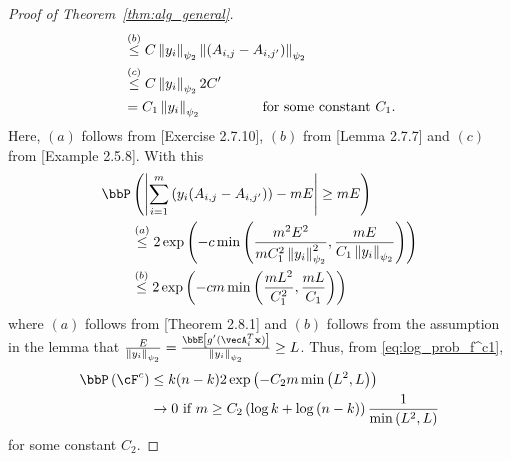\begin{proof}[Proof of Theorem~\ref{thm:alg_general}]
\begin{align*}
&\stackrel{(b)}{\leq} C\left\lVert{y_i}\right\rVert_{\psi_2}\left\lVert\left(A_{i, j}-A_{i, j'}\right)\right\rVert_{\psi_2}\\
&\stackrel{(c)}{\leq} C\left\lVert{y_i}\right\rVert_{\psi_2}2C'\\
& = C_1\left\lVert{y_i}\right\rVert_{\psi_2} \qquad\qquad\text{ for some constant $C_1$}.
\end{align*} Here, $(a)$ follows from [Exercise 2.7.10]\cite{vershynin}, $(b)$ from [Lemma 2.7.7]\cite{vershynin} and $(c)$ from [Example 2.5.8]\cite{vershynin}.
With this
\begin{align*}
\bbP&\inp{\left|\sum_{i=1}^m{ \inp{y_i (A_{i,j}-A_{i,j'})}} - mE\right|\geq mE}\\
&\stackrel{(a)}{\leq} 2\exp\inp{-c\min\inp{\frac{m^2E^2}{mC_1^2\normi{{y_i}}_{\psi_2}^2}, \frac{mE}{C_1\normi{{y_i}}_{\psi_2}} }}\\
&\stackrel{(b)}{\leq} 2\exp\inp{-cm\min\inp{\frac{mL^2}{C_1^2}, \frac{mL}{C_1 }}}
\end{align*} where $(a)$ follows from [Theorem 2.8.1]\cite{vershynin} and $(b)$ follows from the assumption in the lemma that $\frac{E}{\normi{{y_i}}_{\psi_2}} = \frac{\bbE\insq{g'(\vecA_i^T\bx)}}{\normi{{y_i}}_{\psi_2}}\geq L$.
Thus, from \eqref{eq:log_prob_f^c1}, 
\begin{align*}
\bbP\inp{\cF^c}&\leq k(n-k)2\exp\inp{-C_2 m\min\inp{L^2, L}}\\
&\rightarrow 0 \text{ if }m\geq C_2\inp{\log{k}+\log\inp{n-k}}\frac{1}{\min\inp{L^2, L}}
\end{align*} for some constant $C_2$.
\end{proof}


\iffalse

